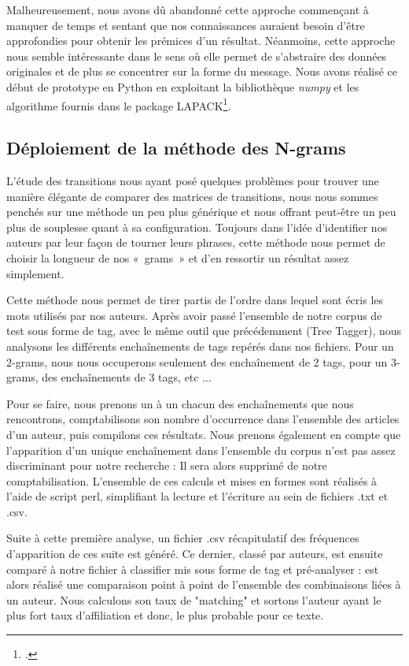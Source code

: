 \documentclass[a4paper,12pt]{report}
\begin{document}
Malheureusement, nous avons dû abandonné cette approche commençant à manquer de temps et sentant que nos connaissances auraient besoin d'être approfondies pour obtenir les prémices d'un résultat. Néanmoins, cette approche nous semble intéressante dans le sens où elle permet de s'abstraire des données originales et de plus se concentrer sur la forme du message. Nous avons réalisé ce début de prototype en Python en exploitant la bibliothèque \textit{numpy} et les algorithme fournis dans le package LAPACK\footcite{http://www.netlib.org/lapack/}.

\subsection{Déploiement de la méthode des N-grams}

L'étude des transitions nous ayant posé quelques problèmes pour trouver une manière élégante de comparer des matrices de transitions, nous nous sommes penchés sur une méthode un peu plus générique et nous offrant peut-être un peu plus de souplesse quant à sa configuration. Toujours dans l'idée d'identifier nos auteurs par leur façon de tourner leurs phrases, cette méthode nous permet de choisir la longueur de nos «~grams~» et d'en ressortir un résultat assez simplement.

Cette méthode nous permet de tirer partis de l'ordre dans lequel sont écris les mots utilisés par nos auteurs. Après avoir passé l'ensemble de notre corpus de test sous forme de tag, avec le même outil que précédemment (Tree Tagger), nous analysons les différents enchaînements de tags repérés dans nos fichiers. Pour un 2-grams, nous nous occuperons seulement des enchaînement de 2 tags, pour un 3-grams, des enchaînements de 3 tags, etc ...

Pour se faire, nous prenons un à un chacun des enchaînements que nous rencontrons, comptabilisons son nombre d'occurrence dans l'ensemble des articles d'un auteur, puis compilons ces résultats. Nous prenons également en compte que l'apparition d'un unique enchaînement dans l'ensemble du corpus n'est pas assez discriminant pour notre recherche : Il sera alors supprimé de notre comptabilisation. L'ensemble de ces calculs et mises en formes sont réalisés à l'aide de script perl, simplifiant la lecture et l'écriture au sein de fichiers .txt et .csv.

Suite à cette première analyse, un fichier .csv récapitulatif des fréquences d'apparition de ces suite est généré. Ce dernier, classé par auteurs, est ensuite comparé à notre fichier à classifier mis sous forme de tag et pré-analyser : est alors réalisé une comparaison point à point de l'ensemble des combinaisons liées à un auteur. Nous calculons son taux de "matching" et sortons l'auteur ayant le plus fort taux d'affiliation et donc, le plus probable pour ce texte. 
\end{document}
